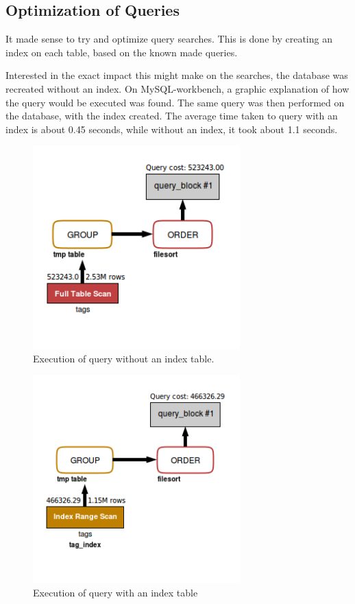 \documentclass{article}
\begin{document}
\subsection{Optimization of Queries}
It made sense to try and optimize query searches.  This is done by
creating an index on each table, based on the known made queries.

Interested in the exact impact this might make on the searches, the database
was recreated without an index.  On MySQL-workbench, a graphic explanation of
how the query would be executed was found. The same query was then performed
on the database, with the index created. The average time taken to query with
an index is about 0.45 seconds, while without an index, it took about 1.1
seconds.

\begin{figure}[h]
	\includegraphics[width=8cm]{Query_eco_code_no_index}
	\caption{Execution of query without an index table.}
	\label{figure:2}
\end{figure}

\begin{figure}[h]
	\includegraphics[width=8cm]{Query_eco_code_w_index}
	\caption{Execution of query with an index table}
	\label{figure:3}
\end{figure}
\end{document}
